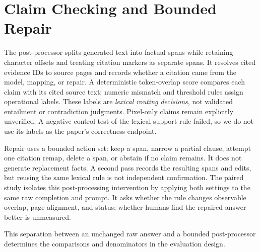 \section{Claim Checking and Bounded Repair}
The post-processor splits generated text into factual spans while retaining character offsets and treating citation markers as separate spans. It resolves cited evidence IDs to source pages and records whether a citation came from the model, mapping, or repair. A deterministic token-overlap score compares each claim with its cited source text; numeric mismatch and threshold rules assign operational labels. These labels are \emph{lexical routing decisions}, not validated entailment or contradiction judgments. Pixel-only claims remain explicitly unverified. A negative-control test of the lexical support rule failed, so we do not use its labels as the paper's correctness endpoint.

Repair uses a bounded action set: keep a span, narrow a partial clause, attempt one citation remap, delete a span, or abstain if no claim remains. It does not generate replacement facts. A second pass records the resulting spans and edits, but reusing the same lexical rule is not independent confirmation. The paired study isolates this post-processing intervention by applying both settings to the same raw completion and prompt. It asks whether the rule changes observable overlap, page alignment, and status; whether humans find the repaired answer better is unmeasured.

This separation between an unchanged raw answer and a bounded post-processor determines the comparisons and denominators in the evaluation design.
